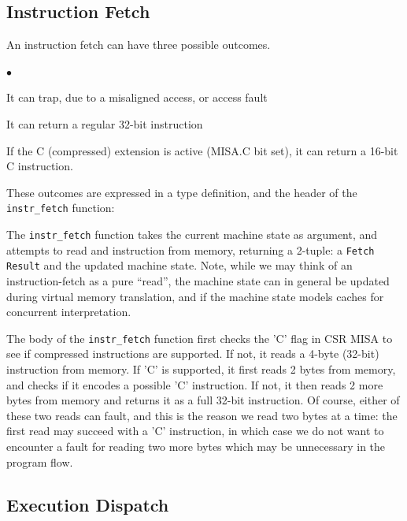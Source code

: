 \documentclass[11pt]{article}
\newenvironment{tightlist}%
{\begin{list}{$\bullet$}{%
    \setlength{\topsep}{0in}
    \setlength{\partopsep}{0in}
    \setlength{\itemsep}{0in}
    \setlength{\parsep}{0in}
    \setlength{\leftmargin}{1.5em}
    \setlength{\rightmargin}{0in}
    \setlength{\itemindent}{0in}
}
}%
{\end{list}
}
\begin{document}

\subsection{Instruction Fetch}

An instruction fetch can have three possible outcomes.
\begin{tightlist}

\item It can trap, due to a misaligned access, or access fault

\item It can return a regular 32-bit instruction

\item If the C (compressed) extension is active (MISA.C bit set), it
can return a 16-bit C instruction.

\end{tightlist}
These outcomes are expressed in a type definition, and the header of
the \verb|instr_fetch| function:



The \verb|instr_fetch| function takes the current machine state as
argument, and attempts to read and instruction from memory, returning
a 2-tuple: a \verb|Fetch Result| and the updated machine state.  Note,
while we may think of an instruction-fetch as a pure ``read'', the
machine state can in general be updated during virtual memory
translation, and if the machine state models caches for concurrent
interpretation.

The body of the \verb|instr_fetch| function first checks the 'C' flag
in CSR MISA to see if compressed instructions are supported.  If not,
it reads a 4-byte (32-bit) instruction from memory.  If 'C' is
supported, it first reads 2 bytes from memory, and checks if it
encodes a possible 'C' instruction. If not, it then reads 2 more bytes
from memory and returns it as a full 32-bit instruction.  Of course,
either of these two reads can fault, and this is the reason we read
two bytes at a time: the first read may succeed with a 'C'
instruction, in which case we do not want to encounter a fault for
reading two more bytes which may be unnecessary in the program flow.


\subsection{Execution Dispatch}
\end{document}
